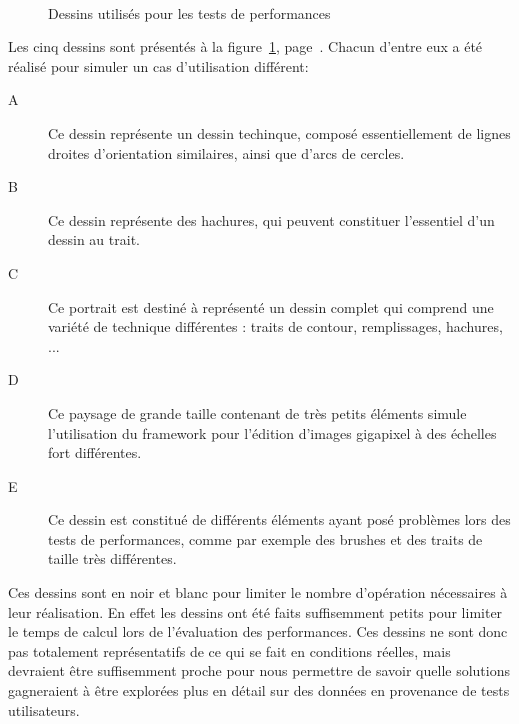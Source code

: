 \begin{figure}[h]
				\\
				\caption{Dessins utilisés pour les tests de performances}
				\label{fig:testdrawings}
			\end{figure}

			Les cinq dessins sont présentés à la figure~\ref{fig:testdrawings}, page~\pageref{fig:testdrawings}. Chacun d'entre eux a été
			réalisé pour simuler un cas d'utilisation différent:
			\begin{description}
				\item[A] Ce dessin représente un dessin techinque, composé essentiellement de lignes droites d'orientation similaires, ainsi
				que d'arcs de cercles. 
				\item[B] Ce dessin représente des hachures, qui peuvent constituer l'essentiel d'un dessin au trait.
				\item[C] Ce portrait est destiné à représenté un dessin complet qui comprend une variété de technique différentes : traits de contour,
				remplissages, hachures, ...
				\item[D] Ce paysage de grande taille contenant de très petits éléments simule l'utilisation du framework pour l'édition d'images
				gigapixel à des échelles fort différentes.
				\item[E] Ce dessin est constitué de différents éléments ayant posé problèmes lors des tests de performances, comme par exemple 
				des brushes et des traits de taille très différentes. 
			\end{description}
			Ces dessins sont en noir et blanc pour limiter le nombre d'opération nécessaires à leur réalisation. En effet les dessins ont été faits 
			suffisemment petits pour limiter le temps de calcul lors de l'évaluation des performances. Ces dessins ne sont donc pas totalement
			représentatifs de ce qui se fait en conditions réelles, mais devraient être suffisemment proche pour nous permettre de savoir quelle
			solutions gagneraient à être explorées plus en détail sur des données en provenance de tests utilisateurs.

